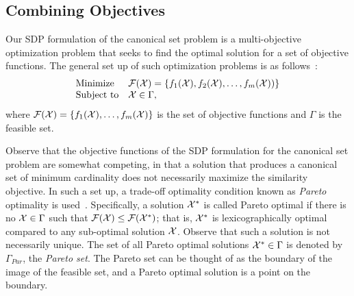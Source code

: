 \documentclass{ieee}
\def\F{{\cal F}}
\def\X{{\cal X}}
\begin{document}
\subsection{Combining Objectives}
\label{sec:combine}
\vspace{-0.1in}
Our SDP formulation of the canonical set problem is a multi-objective
optimization problem that seeks to find the optimal solution for a set
of objective functions.  The general set up of such optimization
problems is as
follows~\cite{multicriteria-optimization,nonlin-multiobj-opt}:
$$
\begin{array}{ll}
{\rm Minimize }& \F(\X)=\{\displaystyle f_1(\X), f_2(\X), \ldots, f_m(\X))\} \\
{\rm Subject\ to} & {\displaystyle \X \in \Gamma},
\end{array}
$$
where $\F(\X)=\{f_1(\X),\ldots, f_m(\X)\}$ is the set of objective
functions and $\Gamma$ is the feasible set. 

Observe that the objective
functions of the SDP formulation for the canonical set problem are somewhat
competing, in that a solution that produces a canonical set of minimum
cardinality does not necessarily maximize the similarity objective.
In such a set up, a trade-off optimality condition known as {\em
  Pareto} optimality is used~\cite{multicriteria-optimization}.
Specifically, a solution $\X^*$ is called Pareto optimal if there is
no $\X \in \Gamma$ such that $\F(\X) \le \F(\X^*)$; that is, $\X^*$ is
lexicographically optimal compared to any sub-optimal solution $\X$.
Observe that such a solution is not necessarily unique. The set of all
Pareto optimal solutions $\X^* \in \Gamma$ is denoted by $\Gamma_{Par}$,
the {\em Pareto set}. The Pareto set can be thought of as the boundary
of the image of the feasible set, and a Pareto optimal solution is a
point on the boundary.
\end{document}
